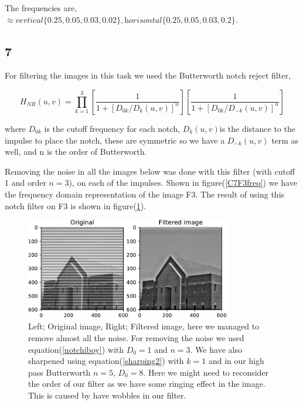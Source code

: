 {The frequencies are, $\approx \textit{vertical}\{0.25, 0.05, 0.03, 0.02\}, \textit{horisontal}\{0.25, 0.05, 0.03, 0.2\}$.





\subsection{7}


For filtering the images in this task we used the Butterworth notch reject filter,

\begin{equation}
    H_{NR}(u,v) = \prod_{k=1}^{3}\left[\frac{1}{1+[D_{0k}/D_{k}(u,v)]^{n}} \right]\left[\frac{1}{1+[D_{0k}/D_{-k}(u,v)]^{n}} \right]
    \label{notchiboy}
\end{equation}

where $D_{0k}$ is the cutoff frequency for each notch, $D_{k}(u,v) $is the distance to the impulse to place the notch, these are symmetric so we have a $D_{-k}(u,v)$ term as well, and n is the order of Butterworth.

Removing the noise in all the images below was done with this filter (with cutoff 1 and order $n = 3$), on each of the impulses. Shown in figure(\ref{C7F3freq}) we have the frequency domain representation of the image F3. The result of using this notch filter on F3 is shown in figure(\ref{C7F3}).

\begin{figure}[!htb]
    {\centering
        \includegraphics[width=0.80\textwidth]{C7F3.pdf}
        \caption{Left; Original image, Right; Filtered image, here we managed to remove almost all the noise. For removing the noise we used equation(\ref{notchiboy}) with $D_{0} = 1$ and $n = 3$.  We have also sharpened using equation(\ref{sharping2}) with $k = 1$ and in our high pass Butterworth $n = 5$, $D_{0} = 8$. Here we might need to reconsider the order of our filter as we have some ringing effect in the image. This is caused by have wobbles in our filter.}
        \label{C7F3}
    \par}
    \end{figure}



}
